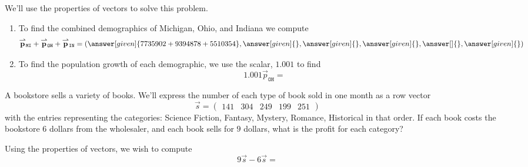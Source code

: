 \documentclass{ximera}
\begin{document}
\begin{example}
\begin{solution}
  We'll use the properties of vectors to solve this problem.
  \begin{enumerate}
  \item To find the combined demographics of Michigan, Ohio, and
    Indiana we compute
    \[
    \vec{p}_{\texttt{MI}} + \vec{p}_{\texttt{OH}} + \vec{p}_{\texttt{IN}} = (\answer[given]{7735902+9394878+5510354},\answer[given]{},\answer[given]{},\answer[given]{},\answer[]{},\answer[given]{})
    \]
  \item To find the population growth of each demographic, we use the scalar, $1.001$ to find
    \[
    1.001 \vec{p}_{\texttt{OH}} =
    \]
  \end{enumerate}
\end{solution}
\end{example}



\begin{example}
  A bookstore sells a variety of books. We'll express the number of
  each type of book sold in one month as a row vector
  \[
  \vec{s} = \begin{pmatrix}141 & 304 & 249 & 199 & 251 \end{pmatrix}
  \]
  with the entries representing the categories: Science Fiction,
  Fantasy, Mystery, Romance, Historical in that order.  If each book
  costs the bookstore $6$ dollars from the wholesaler, and each book sells
  for $9$ dollars, what is the profit for each category?
  \begin{solution}
    Using the properties of vectors, we wish to compute
    \[
    9\vec{s}-6\vec{s} =
    \]
  \end{solution}

\end{example}
\end{document}
